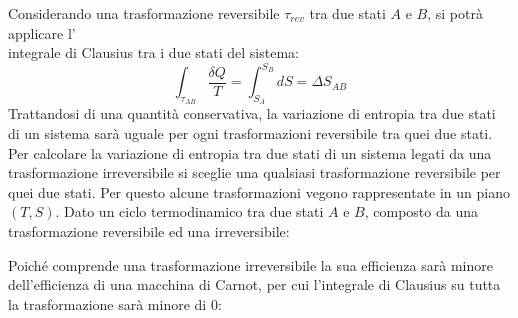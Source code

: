 \documentclass{article}
\numberwithin{equation}{subsection}
\begin{document}
Considerando una trasformazione reversibile $\tau_{rev}$ tra due stati $A$ e $B$, si potrà applicare 
l'\\integrale di Clausius tra i due stati del sistema:
\begin{equation}
    \int_{\tau_{AB}}\displaystyle\frac{\delta Q}{T}=\int_{S_A}^{S_B}dS=\Delta S_{AB}
\end{equation}
Trattandosi di una quantità conservativa, la variazione di entropia tra due stati di un sistema sarà uguale per ogni trasformazioni reversibile tra quei due stati. 
Per 
calcolare la variazione di entropia tra due stati di un sistema legati da una trasformazione irreversibile si sceglie una qualsiasi trasformazione reversibile per 
quei due stati.
Per questo alcune trasformazioni vegono rappresentate in un piano $(T,S)$. 
Dato un ciclo termodinamico tra due stati $A$ e $B$, composto da una trasformazione reversibile ed una irreversibile: 

\begin{center}\end{center}


Poiché comprende una trasformazione irreversibile la sua efficienza sarà minore dell'efficienza di una macchina di Carnot, per cui l'integrale di Clausius su tutta la trasformazione 
sarà minore di $0$:
\end{document}
